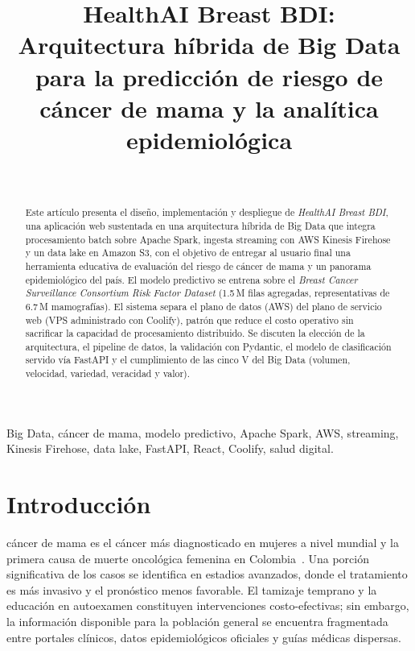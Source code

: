 \documentclass[conference,a4paper,10pt]{IEEEtran}
\title{HealthAI Breast BDI:\\Arquitectura híbrida de Big Data para la predicción de riesgo de cáncer de mama y la analítica epidemiológica}
\author{%
  \IEEEauthorblockN{Agustín Peralta Guarín \quad Natalia Moncaleano}\\
  \IEEEauthorblockA{Programa de Ingeniería de Sistemas, Facultad de Ingenierías\\
  Universidad de San Buenaventura, Bogotá, Colombia\\
  Aplicación: \url{https://bigdata.agustinynatalia.site}}%
}
\begin{document}
\maketitle

\begin{abstract}
Este artículo presenta el diseño, implementación y despliegue de
\emph{HealthAI Breast BDI}, una aplicación web sustentada en una
arquitectura híbrida de Big Data que integra procesamiento batch sobre
Apache Spark, ingesta streaming con AWS Kinesis Firehose y un data lake
en Amazon S3, con el objetivo de entregar al usuario final una
herramienta educativa de evaluación del riesgo de cáncer de mama y un
panorama epidemiológico del país. El modelo predictivo se entrena sobre
el \emph{Breast Cancer Surveillance Consortium Risk Factor Dataset}
(1.5\,M filas agregadas, representativas de 6.7\,M mamografías). El
sistema separa el plano de datos (AWS) del plano de servicio web (VPS
administrado con Coolify), patrón que reduce el costo operativo sin
sacrificar la capacidad de procesamiento distribuido. Se discuten la
elección de la arquitectura, el pipeline de datos, la validación con
Pydantic, el modelo de clasificación servido vía FastAPI y el
cumplimiento de las cinco V del Big Data (volumen, velocidad, variedad,
veracidad y valor).
\end{abstract}

\begin{IEEEkeywords}
Big Data, cáncer de mama, modelo predictivo, Apache Spark, AWS,
streaming, Kinesis Firehose, data lake, FastAPI, React, Coolify, salud
digital.
\end{IEEEkeywords}

\section{Introducción}
 cáncer de mama es el cáncer más diagnosticado en mujeres
a nivel mundial y la primera causa de muerte oncológica femenina en
Colombia~\cite{bcsc,cac}. Una porción significativa de los casos se
identifica en estadios avanzados, donde el tratamiento es más invasivo y
el pronóstico menos favorable. El tamizaje temprano y la educación en
autoexamen constituyen intervenciones costo-efectivas; sin embargo, la
información disponible para la población general se encuentra fragmentada
entre portales clínicos, datos epidemiológicos oficiales y guías médicas
dispersas.
\end{document}
